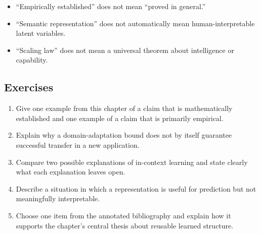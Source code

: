 \begin{itemize}
    \item ``Empirically established'' does not mean ``proved in general.''
    \item ``Semantic representation'' does not automatically mean human-interpretable latent variables.
    \item ``Scaling law'' does not mean a universal theorem about intelligence or capability.
\end{itemize}

\subsection*{Exercises}

\begin{enumerate}
    \item Give one example from this chapter of a claim that is mathematically established and one example of a claim that is primarily empirical.
    \item Explain why a domain-adaptation bound does not by itself guarantee successful transfer in a new application.
    \item Compare two possible explanations of in-context learning and state clearly what each explanation leaves open.
    \item Describe a situation in which a representation is useful for prediction but not meaningfully interpretable.
    \item Choose one item from the annotated bibliography and explain how it supports the chapter's central thesis about reusable learned structure.
\end{enumerate}
